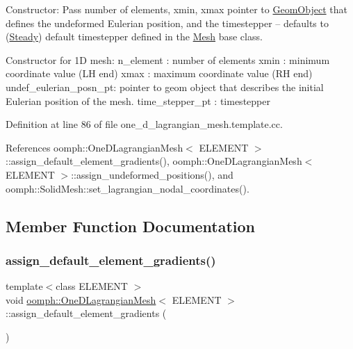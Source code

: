 Constructor\+: Pass number of elements, xmin, xmax pointer to \hyperlink{classoomph_1_1GeomObject}{Geom\+Object} that defines the undeformed Eulerian position, and the timestepper -- defaults to (\hyperlink{classoomph_1_1Steady}{Steady}) default timestepper defined in the \hyperlink{classoomph_1_1Mesh}{Mesh} base class. 

Constructor for 1D mesh\+: n\+\_\+element \+: number of elements xmin \+: minimum coordinate value (LH end) xmax \+: maximum coordinate value (RH end) undef\+\_\+eulerian\+\_\+posn\+\_\+pt\+: pointer to geom object that describes the initial Eulerian position of the mesh. time\+\_\+stepper\+\_\+pt \+: timestepper 

Definition at line 86 of file one\+\_\+d\+\_\+lagrangian\+\_\+mesh.\+template.\+cc.



References oomph\+::\+One\+D\+Lagrangian\+Mesh$<$ E\+L\+E\+M\+E\+N\+T $>$\+::assign\+\_\+default\+\_\+element\+\_\+gradients(), oomph\+::\+One\+D\+Lagrangian\+Mesh$<$ E\+L\+E\+M\+E\+N\+T $>$\+::assign\+\_\+undeformed\+\_\+positions(), and oomph\+::\+Solid\+Mesh\+::set\+\_\+lagrangian\+\_\+nodal\+\_\+coordinates().



\subsection{Member Function Documentation}
\mbox{\label{classoomph_1_1OneDLagrangianMesh_a7a4eabf4901a90b3015d2620fc70f648}} 
\subsubsection{\texorpdfstring{assign\+\_\+default\+\_\+element\+\_\+gradients()}{assign\_default\_element\_gradients()}}
{\footnotesize\ttfamily template$<$class E\+L\+E\+M\+E\+NT $>$ \\
void \hyperlink{classoomph_1_1OneDLagrangianMesh}{oomph\+::\+One\+D\+Lagrangian\+Mesh}$<$ E\+L\+E\+M\+E\+NT $>$\+::assign\+\_\+default\+\_\+element\+\_\+gradients (\begin{DoxyParamCaption}{ }\end{DoxyParamCaption})\hspace{0.3cm}{\ttfamily [private]}}



